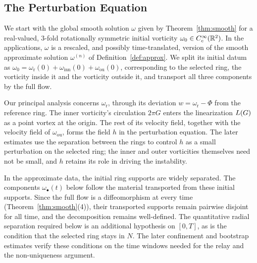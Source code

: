 \subsection{The Perturbation Equation}

We start with the global smooth solution $\omega$ given by
Theorem~\ref{thm:smooth} for a real-valued, $3$-fold rotationally symmetric
initial vorticity $\omega_0\in C_c^\infty(\mathbb{R}^2)$. In the applications,
$\omega$ is a rescaled, and possibly time-translated, version of the smooth
approximate solution $\omega^{(n)}$ of Definition~\ref{def:approx}.
We split its initial datum as
$\omega_0=\omega_{\mathrm r}(0)+\omega_{\mathrm{inn}}(0)+\omega_{\mathrm{ou}}(0)$,
corresponding to the selected ring, the vorticity inside it and the vorticity
outside it, and transport all three components by the full flow.

Our principal analysis concerns $\omega_{\mathrm r}$, through its deviation
$w=\omega_{\mathrm r}-\Phi$ from the reference ring. The inner vorticity's
circulation $2\pi G$ enters the linearization $L(G)$ as a point vortex at
the origin. The rest of its velocity field, together with the velocity field
of $\omega_{\mathrm{ou}}$, forms the field $h$ in the perturbation equation.
The later estimates use the separation between the rings to control $h$ as
a small perturbation on the selected ring; the inner and outer vorticities
themselves need not be small, and $h$ retains its role in driving the
instability.

In the approximate data, the initial ring supports are widely separated.
The components $\omega_\bullet(t)$ below follow the material transported
from these initial supports. Since the full flow is a diffeomorphism at every
time (Theorem~\ref{thm:smooth}\textup{(4)}), their transported supports remain
pairwise disjoint for all time, and the decomposition remains well-defined.
The quantitative radial separation required below is an additional
hypothesis on $[0,T]$, as is the condition that the selected ring stays in
$N$. The later confinement and bootstrap estimates verify these conditions
on the time windows needed for the relay and the non-uniqueness argument.

